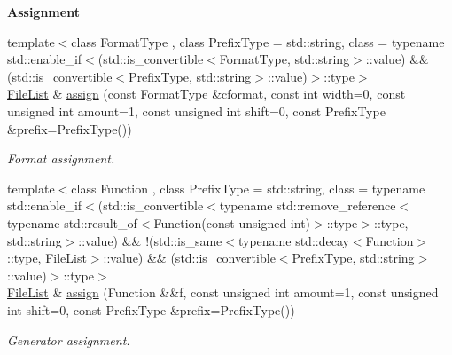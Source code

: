 \begin{Indent}{\bf Assignment}
\begin{DoxyCompactItemize}
{\footnotesize template$<$class Format\-Type , class Prefix\-Type  = std\-::string, class  = typename std\-::enable\-\_\-if$<$(std\-::is\-\_\-convertible$<$\-Format\-Type, std\-::string$>$\-::value) \&\& (std\-::is\-\_\-convertible$<$\-Prefix\-Type, std\-::string$>$\-::value)$>$\-::type$>$ }\\\hyperlink{exceptionmagrathea_1_1FileList}{File\-List} \& \hyperlink{exceptionmagrathea_1_1FileList_a1b56964f57ed5e90fe43023eb8da9de7}{assign} (const Format\-Type \&cformat, const int width=0, const unsigned int amount=1, const unsigned int shift=0, const Prefix\-Type \&prefix=Prefix\-Type())
\begin{DoxyCompactList}\small\item\em Format assignment. \end{DoxyCompactList}\item 
{\footnotesize template$<$class Function , class Prefix\-Type  = std\-::string, class  = typename std\-::enable\-\_\-if$<$(std\-::is\-\_\-convertible$<$typename std\-::remove\-\_\-reference$<$typename std\-::result\-\_\-of$<$\-Function(const unsigned int)$>$\-::type$>$\-::type, std\-::string$>$\-::value) \&\& !(std\-::is\-\_\-same$<$typename std\-::decay$<$\-Function$>$\-::type, File\-List$>$\-::value) \&\& (std\-::is\-\_\-convertible$<$\-Prefix\-Type, std\-::string$>$\-::value)$>$\-::type$>$ }\\\hyperlink{exceptionmagrathea_1_1FileList}{File\-List} \& \hyperlink{exceptionmagrathea_1_1FileList_a3eecce3b3f230b72111b361cc187618a}{assign} (Function \&\&f, const unsigned int amount=1, const unsigned int shift=0, const Prefix\-Type \&prefix=Prefix\-Type())
\begin{DoxyCompactList}\small\item\em Generator assignment. \end{DoxyCompactList}\end{DoxyCompactItemize}
\end{Indent}
